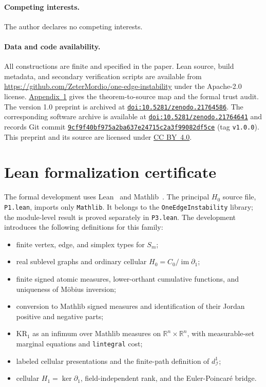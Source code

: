 \documentclass[11pt]{article}
\theoremstyle{definition}
\newcommand{\R}{\mathbb{R}}
\newcommand{\1}{\mathbf{1}}
\newcommand{\KR}{\mathrm{KR}}
\newcommand{\doi}[1]{\href{https://doi.org/#1}{\nolinkurl{doi:#1}}}
\begin{document}
\paragraph{Competing interests.}
The author declares no competing interests.

\paragraph{Data and code availability.}
All constructions are finite and specified in the paper.  Lean source,
build metadata, and secondary verification scripts are available from
\url{https://github.com/ZeterMordio/one-edge-instability} under the
Apache-2.0 license.  \hyperref[app:lean]{Appendix~\ref*{app:lean}} gives the
theorem-to-source map and the formal trust audit.
The version 1.0 preprint is archived at
\doi{10.5281/zenodo.21764586}.
The corresponding software archive is available at
\doi{10.5281/zenodo.21764641}
and records Git commit
\href{https://github.com/ZeterMordio/one-edge-instability/commit/9cf9f40bf975a2ba637e24715c2a3f99082df5ce}{\nolinkurl{9cf9f40bf975a2ba637e24715c2a3f99082df5ce}}
(tag \texttt{v1.0.0}).  This preprint and its source are licensed under
\href{https://creativecommons.org/licenses/by/4.0/}{CC BY~4.0}.

\appendix
\section{Lean formalization certificate}\label{app:lean}

The formal development uses Lean~\cite{deMouraUllrich2021} and
Mathlib~\cite{Mathlib2020}.  The principal $H_0$ source file,
\texttt{P1.lean}, imports only \texttt{Mathlib}.  It belongs to the
\texttt{OneEdgeInstability} library; the module-level result is proved
separately in \texttt{P3.lean}.  The development introduces the following
definitions for this family:

\begin{itemize}[leftmargin=1.4em]
  \item finite vertex, edge, and simplex types for $S_m$;
  \item real sublevel graphs and ordinary cellular $H_0=C_0/\operatorname{im}\partial_1$;
  \item finite signed atomic measures, lower-orthant cumulative functions,
        and uniqueness of Möbius inversion;
  \item conversion to Mathlib signed measures and identification of their
        Jordan positive and negative parts;
  \item $\KR_1$ as an infimum over Mathlib measures on
        $\R^n\times\R^n$, with measurable-set marginal equations and
        \texttt{lintegral} cost;
  \item labeled cellular presentations and the finite-path definition
        of $d_{\mathcal I}^1$;
  \item cellular $H_1=\ker\partial_1$, field-independent rank, and the
        Euler-Poincaré bridge.
\end{itemize}
\end{document}
